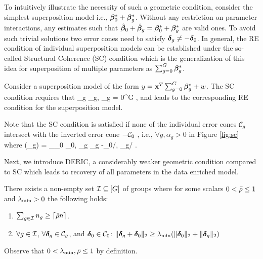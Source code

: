 To intuitively illustrate the necessity of such a geometric condition, consider the simplest superposition model i.e., $\boldsymbol{\beta}^*_0 + \boldsymbol{\beta}^*_g$. Without any restriction on parameter interactions, any estimates such that $\hat{\boldsymbol{\beta}}_0 + \hat{\boldsymbol{\beta}}_g = \boldsymbol{\beta}^*_0 + \boldsymbol{\beta}^*_g$ are valid ones. To avoid such trivial solutions two error cones need to satisfy $\boldsymbol{\delta}_g \neq -\boldsymbol{\delta}_0$. In general, the RE condition of individual superposition models can be established under the so-called Structural Coherence (SC) condition \cite{guba16, mctr13} which is the generalization of this idea for superposition of multiple parameters as $\sum_{g = 0}^{G} \boldsymbol{\beta}^*_g$.
 
\begin{definition} \label{scc}
	Consider a superposition model of the form $y = \mathbf{x}^T \sum_{g = 0}^{G} \boldsymbol{\beta}^*_g + w$. The SC condition requires that
	\be 
	\nr 
	\forall \ddelta_g \in \cC_g, \exists \lambda \quad  {}  \quad {} \geq  \lambda \sum_{g = 0}^{G}  ,
	\ee  
	and leads to the corresponding RE condition for the superposition model.
\end{definition}

\begin{remark}
	Note that the SC condition is satisfied if none of the individual error cones $\cC_g$ intersect with the inverted error cone $-\cC_0$ \cite{guba16, trop15}, i.e., $\forall g, \alpha_g > 0$ in Figure \ref{fig:sc} where 
	\be 
	\nr 
	\cos(\alpha_g) = \sup_{\ddelta_0 \in \cC_0, \ddelta_g \in \cC_g} -\langle \ddelta_0/, \ddelta_g/ \rangle.
	\ee
\end{remark}
Next, we introduce DERIC, a considerably weaker geometric condition compared to SC which leads to recovery of all parameters in the data enriched model. 
\begin{definition}  \label{incodef}
	There exists a non-empty set $\cI\subseteq [G]$ of groups where for some scalars $0 < \bar{\rho}\leq 1$ and $\lambda_{\min}>0$ the following holds:
	\begin{enumerate}
		\item $\sum_{g\in \cI} n_g\geq \lceil \ratio n\rceil$.
		\item $\forall g \in \cI$, $\forall \ddelta_g \in \cC_g$, and $\ddelta_0\in\cC_0$: $\|\boldsymbol{\delta}_g+\boldsymbol{\delta}_0\|_{2}\geq \lambda_{\min} (\|\boldsymbol{\delta}_0\|_{2}+\|\boldsymbol{\delta}_g\|_{2})$
	\end{enumerate}
	Observe that $0 < \lambda_{\min},\bar{\rho}\leq 1$ by definition.
\end{definition}

